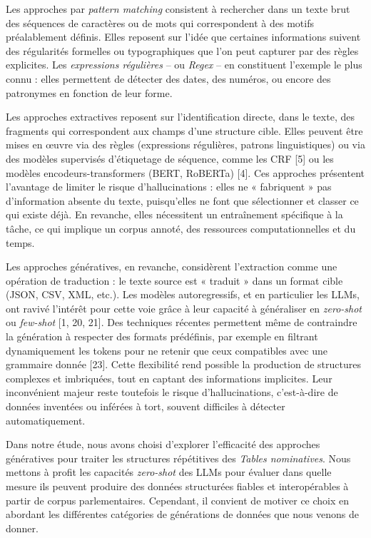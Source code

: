 Les approches par \emph{pattern matching} consistent à rechercher dans un texte brut des séquences de caractères ou de mots qui correspondent à des motifs préalablement définis. Elles reposent sur l’idée que certaines informations suivent des régularités formelles ou typographiques que l’on peut capturer par des règles explicites. Les \emph{expressions régulières} -- ou \emph{Regex} -- en constituent l’exemple le plus connu : elles permettent de détecter des dates, des numéros, ou encore des patronymes en fonction de leur forme. 

Les approches extractives reposent sur l’identification directe, dans le texte, des fragments qui correspondent aux champs d’une structure cible. Elles peuvent être mises en œuvre via des règles (expressions régulières, patrons linguistiques) ou via des modèles supervisés d’étiquetage de séquence, comme les CRF [5] ou les modèles encodeurs-transformers (BERT, RoBERTa) [4]. Ces approches présentent l’avantage de limiter le risque d’hallucinations : elles ne « fabriquent » pas d’information absente du texte, puisqu’elles ne font que sélectionner et classer ce qui existe déjà. En revanche, elles nécessitent un entraînement spécifique à la tâche, ce qui implique un corpus annoté, des ressources computationnelles et du temps.

Les approches génératives, en revanche, considèrent l’extraction comme une opération de traduction : le texte source est « traduit » dans un format cible (JSON, CSV, XML, etc.). Les modèles autoregressifs, et en particulier les LLMs, ont ravivé l’intérêt pour cette voie grâce à leur capacité à généraliser en \emph{zero-shot} ou \emph{few-shot} [1, 20, 21]. Des techniques récentes permettent même de contraindre la génération à respecter des formats prédéfinis, par exemple en filtrant dynamiquement les tokens pour ne retenir que ceux compatibles avec une grammaire donnée [23]. Cette flexibilité rend possible la production de structures complexes et imbriquées, tout en captant des informations implicites. Leur inconvénient majeur reste toutefois le risque d’hallucinations, c’est-à-dire de données inventées ou inférées à tort, souvent difficiles à détecter automatiquement.

Dans notre étude, nous avons choisi d’explorer l’efficacité des approches génératives pour traiter les structures répétitives des \emph{Tables nominatives}. Nous mettons à profit les capacités \emph{zero-shot} des LLMs pour évaluer dans quelle mesure ils peuvent produire des données structurées fiables et interopérables à partir de corpus parlementaires. Cependant, il convient de motiver ce choix en abordant les différentes catégories de générations de données que nous venons de donner.

